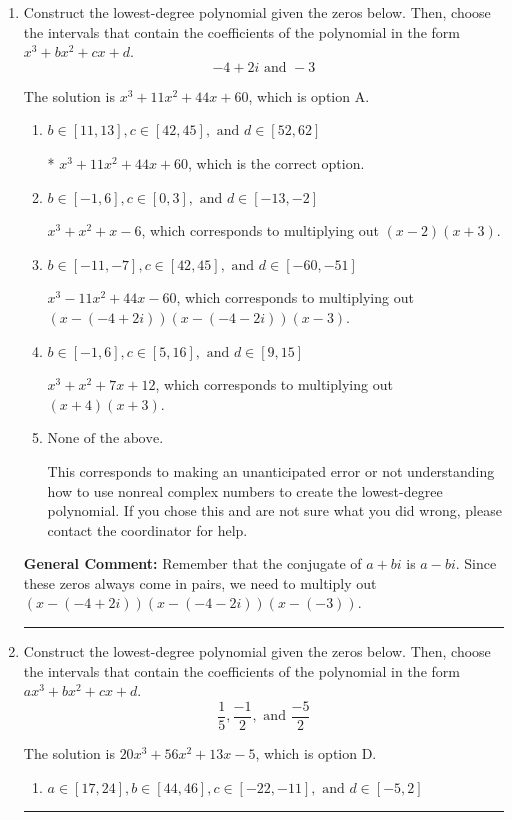 \documentclass{extbook}[14pt]
\newcommand{\litem}[1]{\item #1

\rule{\textwidth}{0.4pt}}
\begin{document}
\begin{enumerate}\litem{
Construct the lowest-degree polynomial given the zeros below. Then, choose the intervals that contain the coefficients of the polynomial in the form $x^3+bx^2+cx+d$.
\[ -4 + 2 i \text{ and } -3 \]

The solution is \( x^{3} +11 x^{2} +44 x + 60 \), which is option A.\begin{enumerate}[label=\Alph*.]
\item \( b \in [11, 13], c \in [42, 45], \text{ and } d \in [52, 62] \)

* $x^{3} +11 x^{2} +44 x + 60$, which is the correct option.
\item \( b \in [-1, 6], c \in [0, 3], \text{ and } d \in [-13, -2] \)

$x^{3} + x^{2} +x -6$, which corresponds to multiplying out $(x -2)(x + 3)$.
\item \( b \in [-11, -7], c \in [42, 45], \text{ and } d \in [-60, -51] \)

$x^{3} -11 x^{2} +44 x -60$, which corresponds to multiplying out $(x-(-4 + 2 i))(x-(-4 - 2 i))(x -3)$.
\item \( b \in [-1, 6], c \in [5, 16], \text{ and } d \in [9, 15] \)

$x^{3} + x^{2} +7 x + 12$, which corresponds to multiplying out $(x + 4)(x + 3)$.
\item \( \text{None of the above.} \)

This corresponds to making an unanticipated error or not understanding how to use nonreal complex numbers to create the lowest-degree polynomial. If you chose this and are not sure what you did wrong, please contact the coordinator for help.
\end{enumerate}

\textbf{General Comment:} Remember that the conjugate of $a+bi$ is $a-bi$. Since these zeros always come in pairs, we need to multiply out $(x-(-4 + 2 i))(x-(-4 - 2 i))(x-(-3))$.
}
\litem{
Construct the lowest-degree polynomial given the zeros below. Then, choose the intervals that contain the coefficients of the polynomial in the form $ax^3+bx^2+cx+d$.
\[ \frac{1}{5}, \frac{-1}{2}, \text{ and } \frac{-5}{2} \]

The solution is \( 20x^{3} +56 x^{2} +13 x -5 \), which is option D.\begin{enumerate}[label=\Alph*.]
\item \( a \in [17, 24], b \in [44, 46], c \in [-22, -11], \text{ and } d \in [-5, 2] \)


\end{enumerate}}
\end{enumerate}
\end{document}
